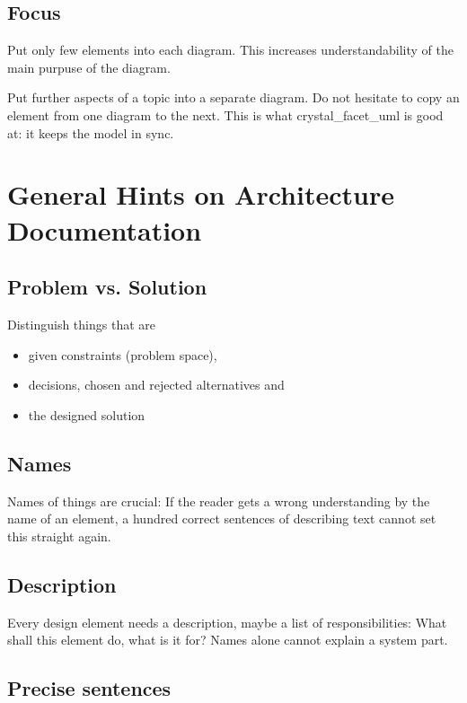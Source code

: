 \subsection{Focus}

Put only few elements into each diagram. This increases understandability of the main purpuse of the diagram.

Put further aspects of a topic into a separate diagram. Do not hesitate to copy an element from one diagram
to the next. This is what crystal\_facet\_uml is good at: it keeps the model in sync.

\section{General Hints on Architecture Documentation}
\label{architecture-hints}

\subsection{Problem vs. Solution}

Distinguish things that are
\begin{itemize}
\item given constraints (problem space),
\item decisions, chosen and rejected alternatives and
\item the designed solution
\end{itemize}

\subsection{Names}

Names of things are crucial: If the reader gets a wrong understanding by the name of an element, a hundred correct sentences
of describing text cannot set this straight again.

\subsection{Description}

Every design element needs a description, maybe a list of responsibilities: What shall this element do, what is it for?
Names alone cannot explain a system part.

\subsection{Precise sentences}


